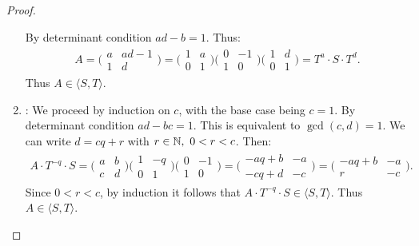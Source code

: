 \begin{proof}
\begin{enumerate}
    By determinant condition $ad-b = 1$. Thus:
    \begin{align*}
        A = \bigg( \begin{matrix}
  a & ad-1\\
  1 & d
\end{matrix} \bigg) = \bigg( \begin{matrix}
  1 & a\\
  0 & 1
\end{matrix} \bigg) \bigg( \begin{matrix}
  0 & -1\\
  1 & 0
\end{matrix} \bigg) \bigg( \begin{matrix}
  1 & d\\
  0 & 1
\end{matrix} \bigg) = T^a \cdot S \cdot T^d.
    \end{align*}
Thus $A \in \langle S,T \rangle$.
    \item {}:
    We proceed by induction on $c$, with the base case being $c=1$. By determinant condition $ad-bc = 1$. This is equivalent to $\gcd(c,d) =1$. We can write $d = cq +r$ with $ r \in \mathbb{N}, \,\, 0 < r < c$. Then:
    \begin{align*}
        A\cdot T^{-q} \cdot S= \bigg( \begin{matrix}
  a & b\\
  c & d
\end{matrix} \bigg) \bigg( \begin{matrix}
  1 & -q\\
  0 & 1
\end{matrix} \bigg) \bigg( \begin{matrix}
  0 & -1\\
  1 & 0
\end{matrix} \bigg) = \bigg( \begin{matrix}
   -aq+b & -a\\
  -cq+d & -c 
\end{matrix} \bigg) = \bigg( \begin{matrix}
   -aq+b & -a\\
  r & -c 
\end{matrix} \bigg).
    \end{align*}
Since $0 < r < c$, by induction it follows that $ A\cdot T^{-q} \cdot S \in \langle S,T \rangle$. Thus $ A \in \langle S,T \rangle$.
    
\end{enumerate}
\end{proof}


